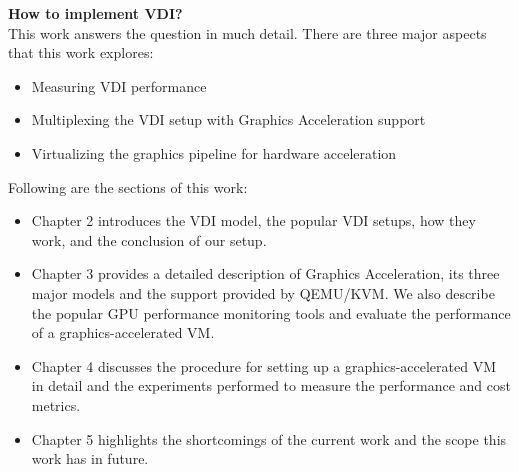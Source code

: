 \documentclass[a4paper,12pt, final]{report}
\begin{document}
\noindent \textbf{How to implement VDI?}\\ 

\noindent This work answers the question in much detail. There are three major aspects that this work explores:

\begin{itemize}
    \item Measuring VDI performance %
    \item Multiplexing the VDI setup with Graphics Acceleration support %
    \item Virtualizing the graphics pipeline for hardware acceleration %
\end{itemize}

\newpage

\noindent Following are the sections of this work:

\begin{itemize}
    \item Chapter 2 introduces the VDI model, the popular VDI setups, how they work, and the conclusion of our setup.
    \item Chapter 3 provides a detailed description of Graphics Acceleration, its three major models and the support provided by QEMU/KVM. We also describe the popular GPU performance monitoring tools and evaluate the performance of a graphics-accelerated VM.
    \item Chapter 4 discusses the procedure for setting up a graphics-accelerated VM in detail and the experiments performed to measure the performance and cost metrics.
    \item Chapter 5 highlights the shortcomings of the current work and the scope this work has in future.
\end{itemize}

\end{document}
